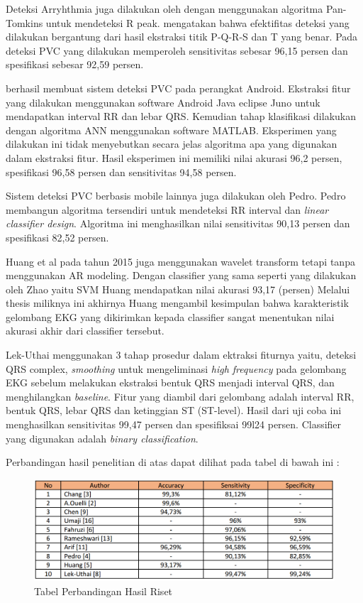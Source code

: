 Deteksi Arryhthmia juga dilakukan oleh \cite{rameshwari} dengan menggunakan algoritma Pan-Tomkins untuk mendeteksi R peak. \cite{rameshwari} mengatakan bahwa efektifitas deteksi yang dilakukan bergantung dari hasil ekstraksi titik P-Q-R-S dan T yang benar. Pada deteksi PVC yang dilakukan memperoleh sensitivitas sebesar 96,15 persen dan spesifikasi sebesar 92,59 persen.   

\cite{Arief2015} berhasil membuat sistem deteksi PVC pada perangkat Android. Ekstraksi fitur yang dilakukan menggunakan software Android Java eclipse Juno untuk mendapatkan interval RR dan lebar QRS. Kemudian tahap klasifikasi dilakukan dengan algoritma ANN menggunakan software MATLAB. Eksperimen yang dilakukan ini tidak menyebutkan secara jelas algoritma apa yang digunakan dalam ekstraksi fitur. Hasil eksperimen ini memiliki nilai akurasi 96,2 persen, 	spesifikasi 96,58 persen dan sensitivitas 94,58 persen.

Sistem deteksi PVC berbasis mobile lainnya juga dilakukan oleh Pedro\cite{Pedro2014}. Pedro membangun algoritma tersendiri untuk mendeteksi RR interval dan \textit{linear classifier design}. Algoritma ini menghasilkan nilai sensitivitas 90,13 persen dan spesifikasi 82,52 persen.

Huang et al \cite{Huang2015Thesis} pada tahun 2015 juga menggunakan wavelet transform tetapi tanpa menggunakan AR modeling. Dengan classifier yang sama seperti yang dilakukan oleh Zhao yaitu SVM Huang mendapatkan nilai akurasi 93,17 (persen) Melalui thesis miliknya ini akhirnya Huang mengambil kesimpulan bahwa karakteristik gelombang EKG yang dikirimkan kepada classifier sangat menentukan nilai akurasi akhir dari classifier tersebut. 

Lek-Uthai \cite{Lekuthai2014} menggunakan 3 tahap prosedur dalam ektraksi fiturnya yaitu, deteksi QRS complex, \textit{smoothing} untuk mengeliminasi \textit{high frequency} pada gelombang EKG sebelum melakukan ekstraksi bentuk QRS menjadi interval QRS, dan menghilangkan \textit{baseline}. Fitur yang diambil dari gelombang adalah interval RR, bentuk QRS, lebar QRS dan ketinggian ST (ST-level). Hasil dari uji coba ini menghasilkan sensitivitas 99,47 persen dan spesifiksai 99l24 persen. Classifier yang digunakan adalah \textit{binary classification}.

Perbandingan hasil penelitian di atas dapat dilihat pada tabel di bawah ini : 
\begin{figure}[h!]
	\centering
	\includegraphics[scale=0.5]{comparison-tab.png}
	\caption{Tabel Perbandingan Hasil Riset}
	\label{fig:my_auth}
\end{figure}
